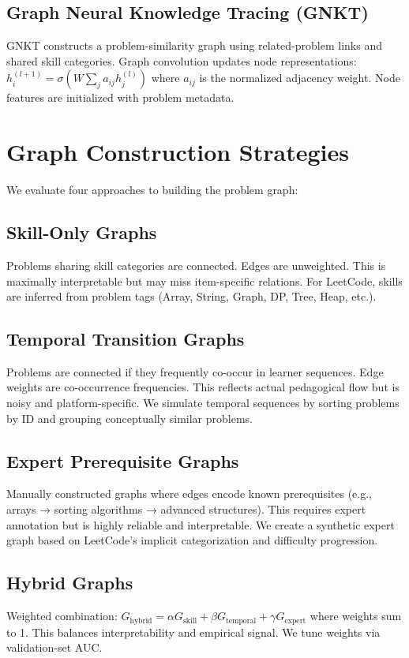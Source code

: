 \documentclass[conference]{IEEEtran}
\begin{document}
\subsection{Graph Neural Knowledge Tracing (GNKT)}
GNKT constructs a problem-similarity graph using related-problem links and shared skill categories. Graph convolution updates node representations: $h_i^{(l+1)} = \sigma(W \sum_j a_{ij}h_j^{(l)})$ where $a_{ij}$ is the normalized adjacency weight. Node features are initialized with problem metadata.

\section{Graph Construction Strategies}

We evaluate four approaches to building the problem graph:

\subsection{Skill-Only Graphs}
Problems sharing skill categories are connected. Edges are unweighted. This is maximally interpretable but may miss item-specific relations. For LeetCode, skills are inferred from problem tags (Array, String, Graph, DP, Tree, Heap, etc.).

\subsection{Temporal Transition Graphs}
Problems are connected if they frequently co-occur in learner sequences. Edge weights are co-occurrence frequencies. This reflects actual pedagogical flow but is noisy and platform-specific. We simulate temporal sequences by sorting problems by ID and grouping conceptually similar problems.

\subsection{Expert Prerequisite Graphs}
Manually constructed graphs where edges encode known prerequisites (e.g., arrays → sorting algorithms → advanced structures). This requires expert annotation but is highly reliable and interpretable. We create a synthetic expert graph based on LeetCode's implicit categorization and difficulty progression.

\subsection{Hybrid Graphs}
Weighted combination: $G_{\text{hybrid}} = \alpha G_{\text{skill}} + \beta G_{\text{temporal}} + \gamma G_{\text{expert}}$ where weights sum to 1. This balances interpretability and empirical signal. We tune weights via validation-set AUC.
\end{document}
